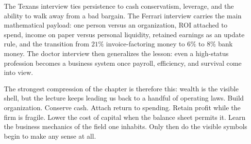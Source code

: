 The Texans interview ties persistence to cash conservatism, leverage, and the ability to walk away from a bad bargain. The Ferrari interview carries the main mathematical payload: one person versus an organization, ROI attached to spend, income on paper versus personal liquidity, retained earnings as an update rule, and the transition from \(21\%\) invoice-factoring money to \(6\%\) to \(8\%\) bank money. The doctor interview then generalizes the lesson: even a high-status profession becomes a business system once payroll, efficiency, and survival come into view.

The strongest compression of the chapter is therefore this: wealth is the visible shell, but the lecture keeps leading us back to a handful of operating laws. Build organization. Conserve cash. Attach return to spending. Retain profit while the firm is fragile. Lower the cost of capital when the balance sheet permits it. Learn the business mechanics of the field one inhabits. Only then do the visible symbols begin to make any sense at all.